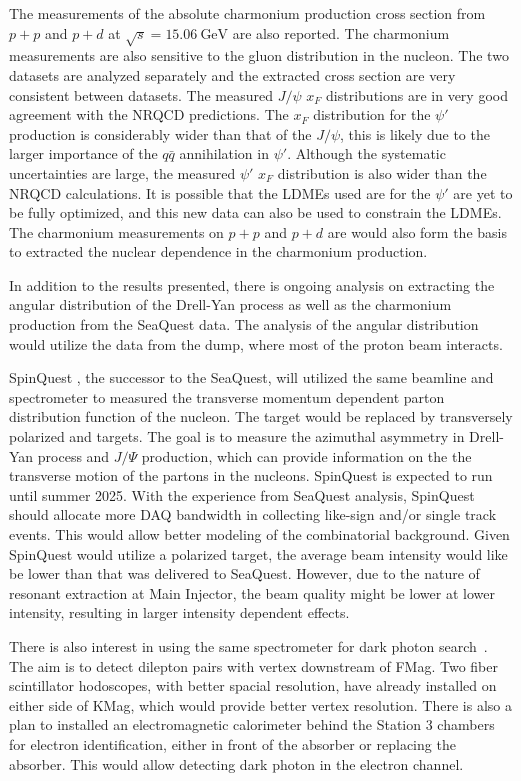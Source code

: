\documentclass[../main.tex]{subfiles}
\begin{document}
The measurements of the absolute charmonium production cross section from $p+p$
and $p+d$ at $\sqrt{s}=\SI{15.06}{\GeV}$ are also reported. The charmonium measurements
are also sensitive to the gluon distribution in the nucleon. The two datasets
are analyzed separately and the extracted cross section are very consistent between
datasets. The measured
$J/\psi$ $x_F$ distributions are in very good agreement with the NRQCD predictions.
The $x_F$ distribution for the $\psi'$ production is considerably wider than that of the
$J/\psi$, this is likely due to the larger importance of the $q\bar{q}$ annihilation
in $\psi'$. Although the systematic uncertainties are large, the measured $\psi'$
$x_F$ distribution is also wider than the NRQCD calculations. It is possible that
the LDMEs used are for the $\psi'$ are yet to be fully optimized, and this new
data can also be used to constrain the LDMEs.
The charmonium measurements on $p+p$ and $p+d$ are would also form the basis to
extracted the nuclear dependence in the charmonium production.

In addition to the results presented, there is ongoing analysis on extracting
the angular distribution of the Drell-Yan process as well as the charmonium
production from the SeaQuest data. The analysis of the angular distribution would
utilize the data from the dump, where most of the proton beam interacts.

SpinQuest \cite{geesaman2014}, the successor to the SeaQuest, will utilized the same beamline and
spectrometer to measured the transverse momentum dependent parton distribution
function of the nucleon. The target would be replaced by transversely polarized 
and  targets. The goal is to measure the azimuthal asymmetry in
Drell-Yan process and $J/\Psi$ production, which can provide information on the
the transverse motion of the partons in the nucleons.
SpinQuest is expected to run until summer 2025. With the experience
from SeaQuest analysis, SpinQuest should allocate more DAQ bandwidth in collecting 
like-sign and/or single track events. This would allow better modeling of the combinatorial 
background. Given SpinQuest would utilize a polarized target,
the average beam intensity would like be lower than that was delivered to SeaQuest.
However, due to the nature of resonant extraction at Main Injector,
the beam quality might be lower at lower intensity, resulting in larger intensity dependent effects.

There is also interest in using the same spectrometer for dark photon search~\cite{apyan2022}. 
The aim is to detect dilepton pairs with vertex downstream of FMag.
Two fiber scintillator hodoscopes, with better spacial resolution, have already installed
on either side of KMag, which would provide better vertex resolution.
There is also a plan to installed an electromagnetic calorimeter behind the
Station 3 chambers for electron identification, either in front of the absorber or replacing the absorber.
This would allow detecting dark photon in the electron
channel.

\ifSubfilesClassLoaded{ \printbibliography[heading=bibintoc,title={References}]}{}
\end{document}
